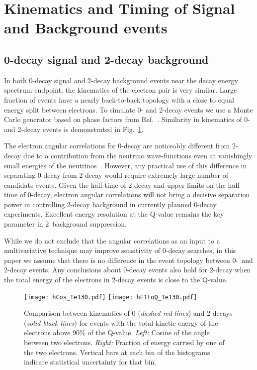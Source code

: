 \section{Kinematics and Timing of Signal and Background events}
\label{sec:kinematics_and_timing}

\subsection{0\nbb-decay signal and 2\nbb-decay background}

In both 0\nbb-decay signal and 2\nbb-decay background events near the decay energy spectrum endpoint, the kinematics of the
electron pair is very similar. Large fraction of events have a nearly back-to-back topology with a close to 
equal energy split between electrons. To simulate 0\nbb- and 2\nbb-decay events we use a Monte Carlo generator based on phase 
factors from Ref.~\cite{Jenni}. Similarity in kinematics of 0\nbb- and 2\nbb-decay events is demonstrated in Fig.~\ref{fig:Kinematics}.

The electron angular correlations for 0\nbb-decay are noticeably different from 2\nbb-decay due to a contribution from the
neutrino wave-functions even at vanishingly small energies of the neutrinos~\cite{Jenni}. However, any practical use of this difference 
in separating 0\nbb-decay from 2\nbb-decay would require extremely large number of candidate events. Given the half-time of 2\nbb-decay 
and upper limits on the half-time of 0\nbb-decay, electron angular correlations will not bring a decisive separation power in controlling 
2\nbb-decay background in currently planned 0\nbb-decay experiments. Excellent energy resolution at the Q-value remains the key parameter
in 2\nbb~background suppression.

While we do not exclude that the angular correlations as an input to a multivariative technique may improve sensitivity of 0\nbb-decay 
searches, in this paper we assume that there is no difference in the event topology between 0\nbb-~and 2\nbb-decay events. Any conclusions 
about 0\nbb-decay events also hold for 2\nbb-decay when the total energy of the electrons in 2\nbb-decay events is close to the Q-value.


\begin{figure}[ht]
  \centering
  \texttt{[image: hCos\_Te130.pdf]}
  \texttt{[image: hE1toQ\_Te130.pdf]}
  \caption{Comparison between kinematics of 0{\nbb} (\emph{dashed red
      lines}) and 2{\nbb} decays (\emph{solid black lines}) for events
    with the total kinetic energy of the electrons above 90\% of the
    Q-value. \emph{Left:} Cosine of the angle between two
    electrons. \emph{Right:} Fraction of energy carried by one of the
    two electrons. Vertical bars at each bin of the histograms indicate
    statistical uncertainty for that bin.}
  \label{fig:Kinematics}
\end{figure}



